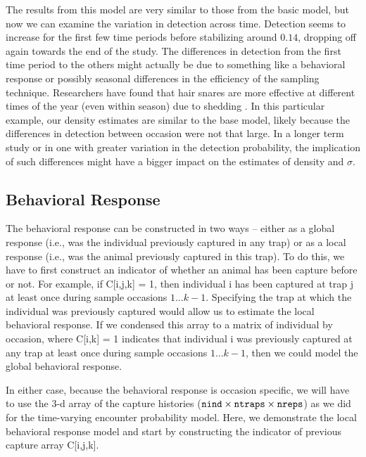 The results from this model are very similar to those from the basic
model, but now we can examine the variation in detection across time.
Detection seems to
increase for the first few time periods before stabilizing around $0.14$, dropping off again towards the end of the study.
The differences in detection from the first time period to the others might
actually be due to something like a behavioral response or possibly seasonal
differences in the efficiency of the sampling technique.
Researchers have found that hair snares are more effective at different
times of the year (even within season) due to shedding \citep{wegan_etal:inpress}.
In this particular example, our density estimates are
similar to the base model, likely because the differences in detection between occasion were not that large.
In a longer term study or in one with greater variation in the detection probability,
the implication of such differences might have a bigger impact on the estimates of density
and $\sigma$.

\subsection{Behavioral Response}

The behavioral response can be constructed in two ways -- either as a
global response (i.e., was the individual previously captured in any trap) or
as a local response (i.e., was the animal previously captured in this
trap).  To do this, we have to first
construct an indicator of whether an animal has been capture before or not.  For
example, if C[i,j,k] = 1, then individual i has been captured at trap j
 at least once during
sample occasions $1 \dots k-1$.  Specifying the trap at which the individual was
previously captured would allow us to estimate the local behavioral response.  If
we condensed this array to a matrix of individual by occasion, where C[i,k] = 1 indicates
that individual i was previously captured at any trap at least once during
sample occasions $1 \dots k-1$, then we
could model the global behavioral response.

In either case, because the behavioral response is occasion specific, we will have to use the 3-d array of the
capture histories ($\mbox{\tt nind} \times \mbox{\tt ntraps} \times
\mbox{\tt nreps}$) as we did for the time-varying encounter probability
model.
Here, we demonstrate the local behavioral response model and start by constructing the
indicator of previous capture array C[i,j,k].

